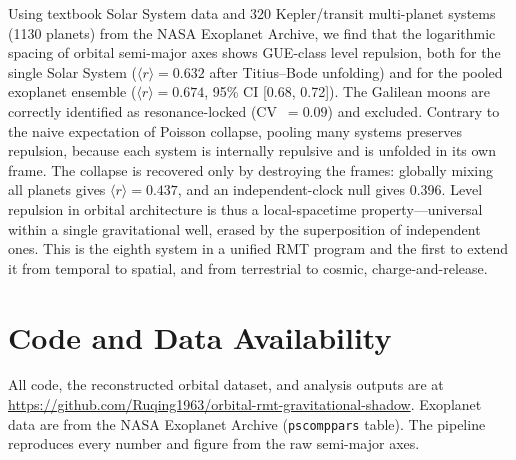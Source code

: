\documentclass[12pt,a4paper]{article}
\begin{document}
Using textbook Solar System data and 320 Kepler/transit multi-planet systems (1130 planets) from the NASA Exoplanet Archive, we find that the logarithmic spacing of orbital semi-major axes shows GUE-class level repulsion, both for the single Solar System ($\langle r\rangle=0.632$ after Titius--Bode unfolding) and for the pooled exoplanet ensemble ($\langle r\rangle=0.674$, 95\% CI [0.68, 0.72]). The Galilean moons are correctly identified as resonance-locked (CV~$=0.09$) and excluded. Contrary to the naive expectation of Poisson collapse, pooling many systems preserves repulsion, because each system is internally repulsive and is unfolded in its own frame. The collapse is recovered only by destroying the frames: globally mixing all planets gives $\langle r\rangle=0.437$, and an independent-clock null gives 0.396. Level repulsion in orbital architecture is thus a local-spacetime property---universal within a single gravitational well, erased by the superposition of independent ones. This is the eighth system in a unified RMT program and the first to extend it from temporal to spatial, and from terrestrial to cosmic, charge-and-release.

\section*{Code and Data Availability}
All code, the reconstructed orbital dataset, and analysis outputs are at \url{https://github.com/Ruqing1963/orbital-rmt-gravitational-shadow}. Exoplanet data are from the NASA Exoplanet Archive (\texttt{pscomppars} table). The pipeline reproduces every number and figure from the raw semi-major axes.
\end{document}
